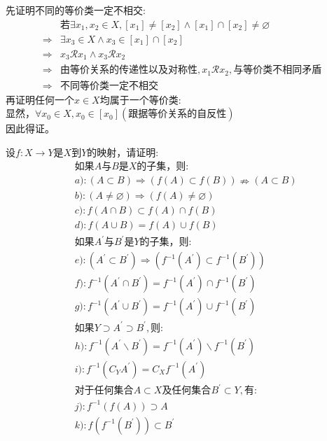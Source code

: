 \begin{solution}
先证明不同的等价类一定不相交:\\
\begin{align*}
&\text{若}\exists x_1,x_2\in X,[x_1]\neq [x_2]\land [x_1]\cap [x_2]\neq \varnothing\\
\Rightarrow&\exists x_3\in X\land x_3\in  [x_1]\cap [x_2]\\
\Rightarrow&x_3\mathcal{R}x_1\land x_3\mathcal{R}x_2\\
\Rightarrow&\text{由等价关系的传递性以及对称性},x_1\mathcal{R}x_2,\text{与等价类不相同矛盾}\\
\Rightarrow&\text{不同等价类一定不相交}
\end{align*}
再证明任何一个$x\in X$均属于一个等价类:\\
显然，$\forall x_0\in X,x_0\in [x_0](\text{跟据等价关系的自反性})$\\
因此得证。
\end{solution}
\newpage
\begin{exercise}
设$f:X\to Y$是$X$到$Y$的映射，请证明:\\
\begin{align*}
&\text{如果}A\text{与}B\text{是}X\text{的子集，则}:\\
&a):(A\subset B)\Rightarrow (f(A)\subset f(B))\nRightarrow (A\subset B)\\
&b):(A\neq \varnothing)\Rightarrow (f(A)\neq \varnothing)\\
&c):f(A\cap B)\subset f(A)\cap f(B)\\
&d):f(A\cup B)=f(A)\cup f(B)\\
&\text{如果}A^\prime\text{与}B^\prime\text{是}Y\text{的子集，则}:\\
&e):(A^\prime \subset B^\prime)\Rightarrow (f^{-1}(A^\prime)\subset f^{-1}(B^\prime))\\
&f):f^{-1}(A^\prime \cap B^\prime)=f^{-1}(A^\prime)\cap f^{-1}(B^\prime)\\
&g):f^{-1}(A^\prime \cup B^\prime)=f^{-1}(A^\prime)\cup f^{-1}(B^\prime)\\
&\text{如果}Y\supset A^\prime \supset B^\prime,\text{则}:\\
&h):f^{-1}(A^\prime \backslash  B^\prime )=f^{-1}(A^\prime)\backslash f^{-1}(B^\prime)\\
&i):f^{-1}(C_Y A^\prime)=C_X f^{-1}(A^\prime)\\
&\text{对于任何集合}A\subset X\text{及任何集合}B^\prime \subset Y,\text{有}:\\
&j):f^{-1}(f(A))\supset A\\
&k):f(f^{-1}(B^\prime))\subset B^\prime
\end{align*}
\end{exercise}

